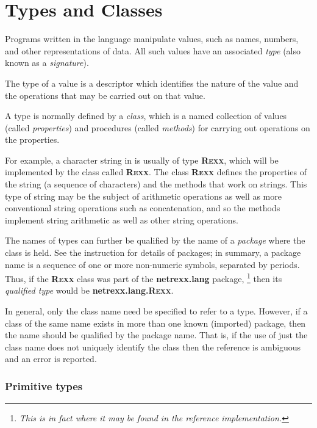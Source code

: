 \chapter{Types and Classes}\label{reftypes}
\index{,}
 
Programs written in the \nr{} language manipulate values, such as
names, numbers, and other representations of data.
All such values have an associated \emph{type} (also known as a
\emph{signature}).
 
The type of a value is a descriptor which identifies the nature of the
value and the operations that may be carried out on that value.
 
A type is normally defined by a \emph{class}, which is a named
collection of values (called \emph{properties}) and procedures (called
\emph{methods}) for carrying out operations on the properties.
 
For example, a character string in \nr{} is usually of
type \textbf{R\textsc{exx}}, which will be implemented by the class
called \textbf{R\textsc{exx}}.
The class \textbf{R\textsc{exx}} defines the properties of the string (a
sequence of characters) and the methods that work on strings.
This type of string may be the subject of arithmetic operations as well
as more conventional string operations such as concatenation, and so the
methods implement string arithmetic as well as other string operations.
 
The names of types can further be qualified by the name of a
\emph{package} where the class is held.  See the 
instruction for details of packages; in summary, a package name is a
sequence of one or more non-numeric symbols, separated by periods.
Thus, if the \textbf{R\textsc{exx}} class was part of
the \textbf{netrexx.lang} package,
\footnote{
\emph{This is in fact where it may be found in the reference
implementation.}
}
then its \emph{qualified type} would be \textbf{netrexx.lang.R\textsc{exx}}.
 
In general, only the class name need be specified to refer to a type.
However, if a class of the same name exists in more than one known
(imported) package, then the name should be qualified by the package
name.  That is, if the use of just the class name does not uniquely
identify the class then the reference is ambiguous and an error is
reported.
\subsection{Primitive types}\label{refprims}
 
